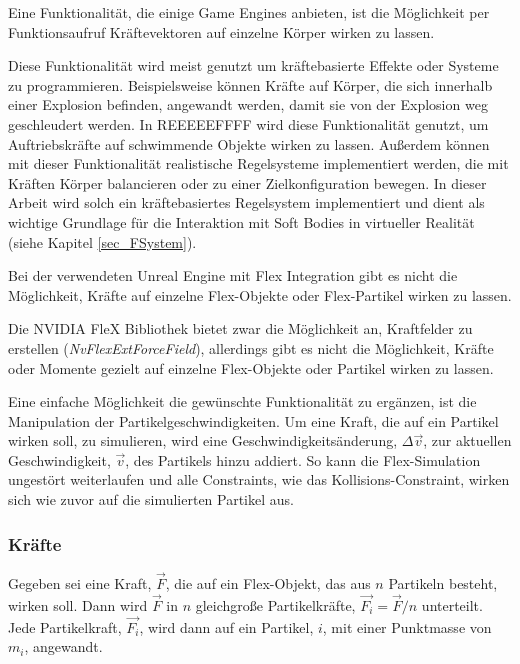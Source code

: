 Eine Funktionalität, die einige Game Engines anbieten, ist die Möglichkeit per Funktionsaufruf Kräftevektoren auf einzelne Körper wirken zu lassen. 

Diese Funktionalität wird meist genutzt um kräftebasierte Effekte oder Systeme zu programmieren. Beispielsweise können Kräfte auf Körper, die sich innerhalb einer Explosion befinden, angewandt werden, damit sie von der Explosion weg geschleudert werden. In REEEEEFFFF wird diese Funktionalität genutzt, um Auftriebskräfte auf schwimmende Objekte wirken zu lassen. 
Außerdem können mit dieser Funktionalität realistische Regelsysteme implementiert werden, die mit Kräften Körper balancieren oder zu einer Zielkonfiguration bewegen. In dieser Arbeit wird solch ein kräftebasiertes Regelsystem implementiert und dient als wichtige Grundlage für die Interaktion mit Soft Bodies in virtueller Realität (siehe Kapitel \ref{sec_FSystem}).

Bei der verwendeten Unreal Engine mit Flex Integration gibt es nicht die Möglichkeit, Kräfte auf einzelne Flex-Objekte oder Flex-Partikel wirken zu lassen.

Die NVIDIA FleX Bibliothek bietet zwar die Möglichkeit an, Kraftfelder zu erstellen (\textit{NvFlexExtForceField}), allerdings gibt es nicht die Möglichkeit, Kräfte oder Momente gezielt auf einzelne Flex-Objekte oder Partikel wirken zu lassen. %

Eine einfache Möglichkeit die gewünschte Funktionalität zu ergänzen, ist die Manipulation der Partikelgeschwindigkeiten. Um eine Kraft, die auf ein Partikel wirken soll, zu simulieren, wird eine Geschwindigkeitsänderung, $\Delta\vec{v}$, zur aktuellen Geschwindigkeit, $\vec{v}$, des Partikels hinzu addiert. So kann die Flex-Simulation ungestört weiterlaufen und alle Constraints, wie das Kollisions-Constraint, wirken sich wie zuvor auf die simulierten Partikel aus.

\subsubsection{Kräfte}
Gegeben sei eine Kraft, $\vec{F}$, die auf ein Flex-Objekt, das aus $n$ Partikeln besteht, wirken soll. Dann wird $\vec{F}$ in $n$ gleichgroße Partikelkräfte, $\vec{F_i} = \vec{F} / n$ unterteilt. Jede Partikelkraft, $\vec{F_i}$, wird dann auf ein Partikel, $i$, mit einer Punktmasse von $m_i$, angewandt.

